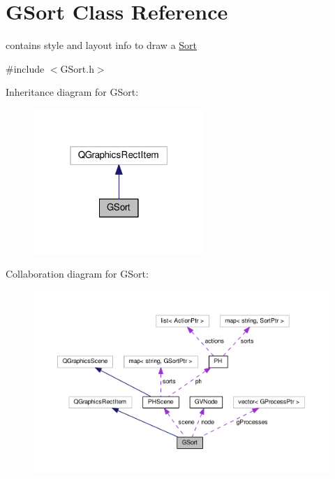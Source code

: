\hypertarget{classGSort}{\section{G\+Sort Class Reference}
\label{classGSort}
}


contains style and layout info to draw a \hyperlink{classSort}{Sort}  




{\ttfamily \#include $<$G\+Sort.\+h$>$}



Inheritance diagram for G\+Sort\+:\nopagebreak
\begin{figure}[H]
\begin{center}
\leavevmode
\includegraphics[width=184pt]{classGSort__inherit__graph}
\end{center}
\end{figure}


Collaboration diagram for G\+Sort\+:\nopagebreak
\begin{figure}[H]
\begin{center}
\leavevmode
\includegraphics[width=350pt]{classGSort__coll__graph}
\end{center}
\end{figure}
